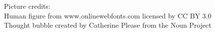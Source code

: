 \begin{preview}
\begin{minipage}{\textwidth}
\footnotesize
Picture credits:\\
Human figure from www.onlinewebfonts.com licensed by CC BY 3.0\\
Thought bubble created by Catherine Please from the Noun Project
\end{minipage}
\end{preview}

